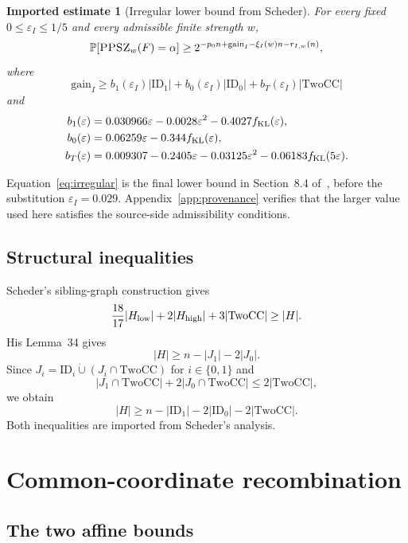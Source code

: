 \documentclass[11pt]{article}
\newtheorem{inputlemma}[theorem]{Imported estimate}
\newcommand{\PPSZ}{\textnormal{\textsc{PPSZ}}}
\newcommand{\TwoCC}{\mathrm{TwoCC}}
\newcommand{\ID}{\mathrm{ID}}
\newcommand{\eps}{\varepsilon}
\newcommand{\gain}{\mathrm{gain}}
\newcommand{\Prb}{\mathbb P}
\begin{document}
\begin{inputlemma}[Irregular lower bound from Scheder]\label{lem:irregular}
For every fixed $0\le\eps_I\le1/5$ and every admissible finite strength $w$,
\[
 \Prb[\PPSZ_w(F)=\alpha]
 \ge
 2^{-p_0n+\gain_I-\xi_I(w)n-r_{I,w}(n)},
\]
where
\begin{equation}\label{eq:irregular}
 \gain_I
 \ge
 b_1(\eps_I)|\ID_1|+b_0(\eps_I)|\ID_0|+b_T(\eps_I)|\TwoCC|
\end{equation}
and
\begin{align}
 b_1(\eps)&=0.030966\eps-0.0028\eps^2-0.4027f_{\rm KL}(\eps),
 \label{eq:b1}\\
 b_0(\eps)&=0.06259\eps-0.344f_{\rm KL}(\eps),
 \label{eq:b0}\\
 b_T(\eps)&=0.009307-0.2405\eps-0.03125\eps^2
             -0.06183f_{\rm KL}(5\eps).
 \label{eq:bT}
\end{align}
\end{inputlemma}

Equation~\eqref{eq:irregular} is the final lower bound in Section~8.4 of~\cite{SchederFull}, before the substitution $\eps_I=0.029$.  Appendix~\ref{app:provenance} verifies that the larger value used here satisfies the source-side admissibility conditions.

\subsection{Structural inequalities}

Scheder's sibling-graph construction gives
\begin{equation}\label{eq:structure-H}
 \frac{18}{17}|H_{\rm low}|+2|H_{\rm high}|+3|\TwoCC|
 \ge |H|.
\end{equation}
His Lemma~34 gives
\[
 |H|\ge n-|J_1|-2|J_0|.
\]
Since $J_i=\ID_i\mathbin{\dot\cup}(J_i\cap\TwoCC)$ for $i\in\{0,1\}$ and
\[
 |J_1\cap\TwoCC|+2|J_0\cap\TwoCC|
 \le2|\TwoCC|,
\]
we obtain
\begin{equation}\label{eq:H-lower}
 |H|\ge n-|\ID_1|-2|\ID_0|-2|\TwoCC|.
\end{equation}
Both inequalities are imported from Scheder's analysis.

\section{Common-coordinate recombination}\label{sec:combination}

\subsection{The two affine bounds}
\end{document}

